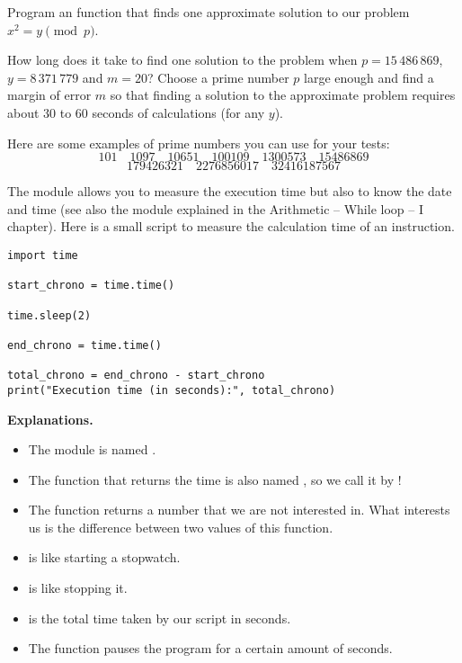\documentclass[11pt,class=report,crop=false]{standalone}
\begin{document}
\begin{activite}
\begin{enumerate}
	Program an  function that finds one approximate solution to our problem $x^2 = y \pmod{p}$.
	
	How long does it take to find one solution to the problem when $p = 15\,486\,869$, $y = 8\,371\,779$ and $m=20$?
	Choose a prime number $p$ large enough and find a margin of error $m$ so that finding a solution to the approximate problem requires about 30 to 60 seconds of calculations (for any $y$).

\end{enumerate}
  

Here are some examples of prime numbers you can use for your tests:
$$101 \quad
1097 \quad
10651 \quad
100109 \quad
1300573 \quad
15486869$$
$$179426321 \quad  
2276856017 \quad 
32416187567$$
\end{activite}




\begin{cours}[Stopwatch]


The  module allows you to measure the execution time but also to know the date and time (see also the  module explained in the \og{}Arithmetic -- While loop -- I\fg{} chapter).
Here is a small script to measure the calculation time of an instruction. 

\begin{lstlisting}
import time

start_chrono = time.time()

time.sleep(2)

end_chrono = time.time()

total_chrono = end_chrono - start_chrono
print("Execution time (in seconds):", total_chrono)
\end{lstlisting}


\textbf{Explanations.}
\begin{itemize}
  \item The module is named .
  \item The function that returns the time is also named , so we call it by !
  \item The  function returns a number that we are not interested in. What interests us is the difference between two values of this function. 
  \item {} is like starting a stopwatch.
  \item {} is like stopping it.
  \item {} is the total time taken by our script in seconds.
  \item The  function pauses the program for a certain amount of seconds.
\end{itemize}
\end{cours}
\end{document}
